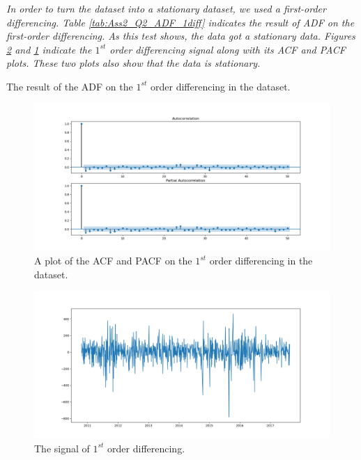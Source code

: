 \textit{In order to turn the dataset into a stationary dataset, we used a first-order differencing. Table \ref{tab:Ass2_Q2_ADF_1diff} indicates the result of \gls{ADF}  on the first-order differencing. As this test shows, the data got a stationary data. Figures \ref{fig:Ass2_Q2_1diff_signal} and \ref{fig:Ass2_Q2_PACF_ACF_1diff} indicate the $1^{st}$ order differencing signal along with its \gls{ACF} and \gls{PACF} plots. These two plots also show that the data is stationary. }

\begin{table}[H]
\centering
\caption{The result of the \gls{ADF} on the $1^{st}$ order differencing in the dataset.}
\label{tab:Ass2_Q2_ADF_1diff}

\end{table}

\begin{figure}[H]
    \centering
    \begin{minipage}[b]{1\textwidth}
        \includegraphics[width=\textwidth]{manuscript/src/figures/Ass2/Ass2_Q2_PACF_ACF_1diff.png}
    \end{minipage}
    \caption{ A plot of the \gls{ACF} and \gls{PACF} on the $1^{st}$ order differencing in the dataset.}
    \label{fig:Ass2_Q2_PACF_ACF_1diff}
\end{figure}
\begin{figure}[H]
    \centering
    \begin{minipage}[b]{1\textwidth}
        \includegraphics[width=\textwidth]{manuscript/src/figures/Ass2/Ass2_Q2_1diff_signal.png}
    \end{minipage}
    \caption{ The signal of $1^{st}$ order differencing.}
    \label{fig:Ass2_Q2_1diff_signal}
\end{figure}




